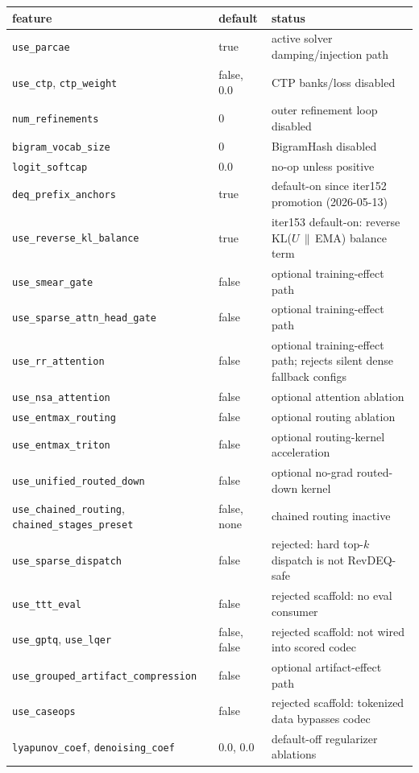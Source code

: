 \documentclass[11pt]{article}
\begin{document}
\begin{center}\small
\begin{tabular}{lll}
\toprule
\textbf{feature} & \textbf{default} & \textbf{status} \\
\midrule
\texttt{use\_parcae} & true & active solver damping/injection path \\
\texttt{use\_ctp}, \texttt{ctp\_weight} & false, 0.0 & CTP banks/loss disabled \\
\texttt{num\_refinements} & 0 & outer refinement loop disabled \\
\texttt{bigram\_vocab\_size} & 0 & BigramHash disabled \\
\texttt{logit\_softcap} & 0.0 & no-op unless positive \\
\texttt{deq\_prefix\_anchors} & true & default-on since iter152 promotion (2026-05-13) \\
\texttt{use\_reverse\_kl\_balance} & true & iter153 default-on: reverse KL($U\,\|\,$EMA) balance term \\
\texttt{use\_smear\_gate} & false & optional training-effect path \\
\texttt{use\_sparse\_attn\_head\_gate} & false & optional training-effect path \\
\texttt{use\_rr\_attention} & false & optional training-effect path; rejects silent dense fallback configs \\
\texttt{use\_nsa\_attention} & false & optional attention ablation \\
\texttt{use\_entmax\_routing} & false & optional routing ablation \\
\texttt{use\_entmax\_triton} & false & optional routing-kernel acceleration \\
\texttt{use\_unified\_routed\_down} & false & optional no-grad routed-down kernel \\
\texttt{use\_chained\_routing}, \texttt{chained\_stages\_preset} & false, none & chained routing inactive \\
\texttt{use\_sparse\_dispatch} & false & rejected: hard top-$k$ dispatch is not RevDEQ-safe \\
\texttt{use\_ttt\_eval} & false & rejected scaffold: no eval consumer \\
\texttt{use\_gptq}, \texttt{use\_lqer} & false, false & rejected scaffold: not wired into scored codec \\
\texttt{use\_grouped\_artifact\_compression} & false & optional artifact-effect path \\
\texttt{use\_caseops} & false & rejected scaffold: tokenized data bypasses codec \\
\texttt{lyapunov\_coef}, \texttt{denoising\_coef} & 0.0, 0.0 & default-off regularizer ablations \\
\bottomrule
\end{tabular}
\end{center}
\end{document}
